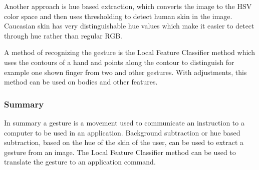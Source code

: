 Another approach is hue based extraction, which converts the image to the HSV color space and then uses thresholding to detect human skin in the image. Caucasian skin has very distinguishable hue values which make it easier to detect through hue rather than regular RGB. \parencite{Busaryev}
\bigskip

A method of recognizing the gesture is the Local Feature Classifier method \parencite{Busaryev} which uses the contours of a hand and points along the contour to distinguish for example one shown finger from two and other gestures. With adjustments, this method can be used on bodies and other features.

\subsubsection*{Summary}
In summary a gesture is a movement used to communicate an instruction to a computer to be used in an application. Background subtraction or hue based subtraction, based on the hue of the skin of the user, can be used to extract a gesture from an image. The Local Feature Classifier method can be used to translate the gesture to an application command.